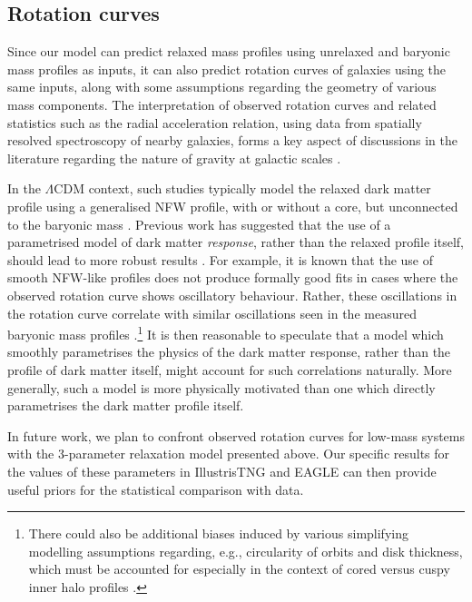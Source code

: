 \subsection{Rotation curves}
Since our model can predict relaxed mass profiles using unrelaxed and baryonic mass profiles as inputs, it can also predict rotation curves of galaxies using the same inputs, along with some assumptions regarding the geometry of various mass components. 
The interpretation of observed rotation curves and related statistics such as the radial acceleration relation, using data from spatially resolved spectroscopy of nearby galaxies, forms a key aspect of discussions in the literature regarding the nature of gravity at galactic scales \citep[e.g.,][]{lms16b,lmsp17}. 

In the $\Lambda$CDM context, such studies typically model the relaxed dark matter profile using a generalised NFW profile, with or without a core, but unconnected to the baryonic mass \citep[e.g.,][]{llms20}. Previous work has suggested that the use of a parametrised model of dark matter \emph{response}, rather than the relaxed profile itself, should lead to more robust results \citep{2021MNRAS.507..632P,pscs21}. For example, it is known that the use of smooth NFW-like profiles does not produce formally good fits in cases where the observed rotation curve shows oscillatory behaviour. Rather, these oscillations in the rotation curve  correlate with similar oscillations seen in the measured baryonic mass profiles \citep[see, e.g., figs.~4 and~6 of][]{llms20}.\footnote{There could also be additional biases induced by various simplifying modelling assumptions regarding, e.g., circularity of orbits and disk thickness, which must be accounted for especially in the context of cored versus cuspy inner halo profiles \citep[see, e.g., the discussion in][]{roper+22}.} It is then reasonable to speculate that a model which smoothly parametrises the physics of the dark matter response, rather than the profile of dark matter itself, might account for such correlations naturally. More generally, such a model is more physically motivated than one which directly parametrises the dark matter profile itself. 

In future work, we plan to confront observed rotation curves for low-mass systems with the 3-parameter relaxation model presented above. Our specific results for the values of these parameters in IllustrisTNG and EAGLE can then provide useful priors for the statistical comparison with data.












